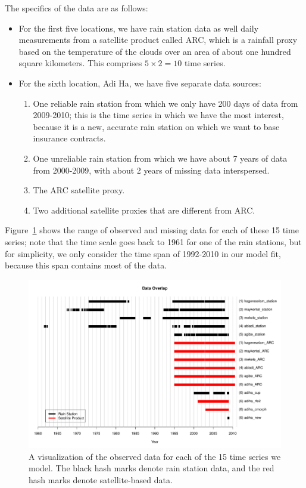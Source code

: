 \documentclass[12pt]{article}
\begin{document}
The specifics of the data are as follows:
\begin{itemize}
\item For the first five locations, we have rain station data as well daily measurements from a satellite product called ARC, which is a rainfall proxy based on the temperature of the clouds over an area of about one hundred square kilometers. This comprises $ 5 \times 2 = 10$ time series.
\item For the sixth location, Adi Ha, we have five separate data sources:
\begin{enumerate}
\item One reliable rain station from which we only have 200 days of data from 2009-2010; this is the time series in which we have the most interest, because it is a new, accurate rain station on which we want to base insurance contracts.
\item One unreliable rain station from which we have about 7 years of data from 2000-2009, with about 2 years of missing data interspersed.
\item The ARC satellite proxy.
\item Two additional satellite proxies that are different from ARC.
\end{enumerate}
\end{itemize}

Figure~\ref{fig_overlap} shows the range of observed and missing data for each of these 15 time series; note that the time scale goes back to 1961 for one of the rain stations, but for simplicity, we only consider the time span of 1992-2010 in our model fit, because this span contains most of the data.

\begin{figure}[htbp]
\begin{center}
\includegraphics[width=5.0in]{fig_observed_data_new.pdf}
\caption{A visualization of the observed data for each of the 15 time series we model. The black hash marks denote rain station data, and the red hash marks denote satellite-based data.}
\label{fig_overlap}
\end{center}
\end{figure}
\end{document}

